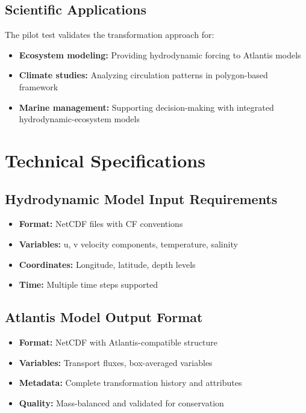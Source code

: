 \documentclass[12pt,a4paper,twoside,times,sky,formal]{csiroreport2017}
\begin{document}
\subsection{Scientific Applications}

The pilot test validates the transformation approach for:
\begin{itemize}
\item \textbf{Ecosystem modeling:} Providing hydrodynamic forcing to Atlantis models
\item \textbf{Climate studies:} Analyzing circulation patterns in polygon-based framework
\item \textbf{Marine management:} Supporting decision-making with integrated hydrodynamic-ecosystem models
\end{itemize}

\section{Technical Specifications}

\subsection{Hydrodynamic Model Input Requirements}
\begin{itemize}
\item \textbf{Format:} NetCDF files with CF conventions
\item \textbf{Variables:} u, v velocity components, temperature, salinity
\item \textbf{Coordinates:} Longitude, latitude, depth levels
\item \textbf{Time:} Multiple time steps supported
\end{itemize}

\subsection{Atlantis Model Output Format}
\begin{itemize}
\item \textbf{Format:} NetCDF with Atlantis-compatible structure
\item \textbf{Variables:} Transport fluxes, box-averaged variables
\item \textbf{Metadata:} Complete transformation history and attributes
\item \textbf{Quality:} Mass-balanced and validated for conservation
\end{itemize}
\end{document}
